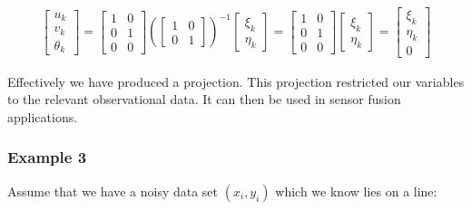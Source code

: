 \[\begin{aligned}
\begin{bmatrix}
 u_k \\ v_k \\ \theta_k
\end{bmatrix}
=
\begin{bmatrix}
 1 & 0  \\
0 & 1 \\
0 & 0
\end{bmatrix}
\left(
\begin{bmatrix}
 1 & 0  \\
0 & 1
\end{bmatrix}
\right)^{-1}
\begin{bmatrix} \xi_k \\ \eta_k \end{bmatrix}
=
\begin{bmatrix}
 1 & 0  \\
0 & 1 \\
0 & 0
\end{bmatrix}
\begin{bmatrix} \xi_k \\ \eta_k \end{bmatrix}
=
\begin{bmatrix} \xi_k \\ \eta_k \\ 0 \end{bmatrix}
\end{aligned}\]

Effectively we have produced a projection. This projection restricted
our variables to the relevant observational data. It can then be used in
sensor fusion applications.

\hypertarget{example-3}{%
\subsubsection{Example 3}\label{example-3}}

Assume that we have a noisy data set \((x_i, y_i)\) which we know lies
on a line:

